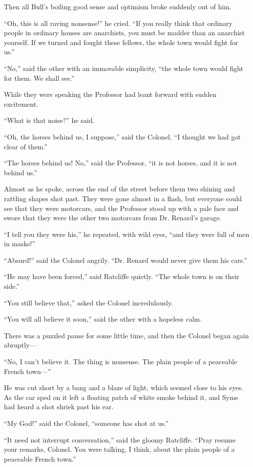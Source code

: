 Then all Bull’s boiling good sense and optimism broke suddenly out of him.

“Oh, this is all raving nonsense!” he cried. “If you really think that ordinary people in ordinary houses are anarchists, you must be madder than an anarchist yourself. If we turned and fought these fellows, the whole town would fight for us.”

“No,” said the other with an immovable simplicity, “the whole town would fight for them. We shall see.”

While they were speaking the Professor had leant forward with sudden excitement.

“What is that noise?” he said.

“Oh, the horses behind us, I suppose,” said the Colonel. “I thought we had got clear of them.”

“The horses behind us! No,” said the Professor, “it is not horses, and it is not behind us.”

Almost as he spoke, across the end of the street before them two shining and rattling shapes shot past. They were gone almost in a flash, but everyone could see that they were motorcars, and the Professor stood up with a pale face and swore that they were the other two motorcars from Dr. Renard’s garage.

“I tell you they were his,” he repeated, with wild eyes, “and they were full of men in masks!”

“Absurd!” said the Colonel angrily. “Dr. Renard would never give them his cars.”

“He may have been forced,” said Ratcliffe quietly. “The whole town is on their side.”

“You still believe that,” asked the Colonel incredulously.

“You will all believe it soon,” said the other with a hopeless calm.

There was a puzzled pause for some little time, and then the Colonel began again abruptly⁠—

“No, I can’t believe it. The thing is nonsense. The plain people of a peaceable French town⁠—”

He was cut short by a bang and a blaze of light, which seemed close to his eyes. As the car sped on it left a floating patch of white smoke behind it, and Syme had heard a shot shriek past his ear.

“My God!” said the Colonel, “someone has shot at us.”

“It need not interrupt conversation,” said the gloomy Ratcliffe. “Pray resume your remarks, Colonel. You were talking, I think, about the plain people of a peaceable French town.”

